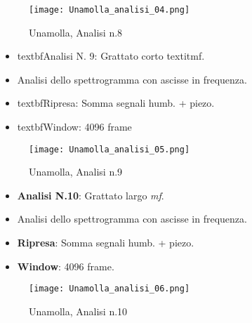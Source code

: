 \begin{figure}

\begin{center}

\texttt{[image: Unamolla\_analisi\_04.png]}

\caption{Unamolla, Analisi n.8}

\label{fig:08_analisi_molla}

\end{center}

\end{figure}
\begin{itemize}
\item{textbf{Analisi N. 9}: Grattato corto textit{mf}.}
\item{Analisi dello spettrogramma con ascisse in frequenza.}
\item{textbf{Ripresa}: Somma segnali humb. + piezo.}
\item{textbf{Window}: 4096 frame}
\end{itemize}

\begin{figure}

\begin{center}

\texttt{[image: Unamolla\_analisi\_05.png]}

\caption{Unamolla, Analisi n.9}

\label{fig:09_analisi_molla}

\end{center}

\end{figure}
\begin{itemize}
\item{\textbf{Analisi N.10}: Grattato largo \textit{mf}.}
\item{Analisi dello spettrogramma con ascisse in frequenza.}
\item{\textbf{Ripresa}: Somma segnali humb. + piezo.}
\item{\textbf{Window}: 4096 frame.}
\end{itemize}

\begin{figure}

\begin{center}

\texttt{[image: Unamolla\_analisi\_06.png]}

\caption{Unamolla, Analisi n.10}

\label{fig:10_analisi_molla}

\end{center}

\end{figure}

